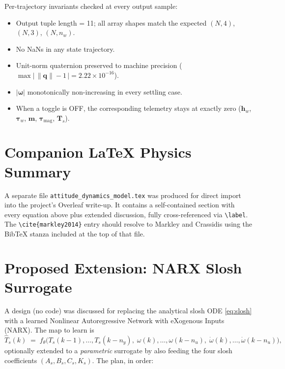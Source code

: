 \noindent Per-trajectory invariants checked at every output sample:
\begin{itemize}\setlength{\itemsep}{1pt}
  \item Output tuple length = 11; all array shapes match the expected
        \((N,4)\), \((N,3)\), \((N,n_w)\).
  \item No NaNs in any state trajectory.
  \item Unit-norm quaternion preserved to machine precision
        (\(\max\bigl|\,\|\bm{q}\|-1\,\bigr| = 2.22\times10^{-16}\)).
  \item \(|\bm{\omega}|\) monotonically non-increasing in every settling case.
  \item When a toggle is OFF, the corresponding telemetry stays at
        exactly zero (\(\bm{h}_w\), \(\bm{\tau}_w\), \(\bm{m}\),
        \(\bm{\tau}_{\text{mag}}\), \(\bm{T}_s\)).
\end{itemize}


\section{Companion LaTeX Physics Summary}

A separate file \texttt{attitude\_dynamics\_model.tex} was produced for
direct import into the project's Overleaf write-up. It contains a
self-contained section with every equation above plus extended
discussion, fully cross-referenced via \texttt{\textbackslash label}.
The \texttt{\textbackslash cite\{markley2014\}} entry should resolve to
Markley and Crassidis using the BibTeX stanza included at the top of that
file.


\section{Proposed Extension: NARX Slosh Surrogate}

A design (no code) was discussed for replacing the analytical slosh ODE
\eqref{eq:slosh} with a learned Nonlinear Autoregressive Network with
eXogenous Inputs (NARX). The map to learn is
\begin{equation}
\hat{T}_s(k) \;=\; f_\theta\bigl(
  T_s(k{-}1),\dots,T_s(k{-}n_y),\;
  \omega(k),\dots,\omega(k{-}n_u),\;
  \dot\omega(k),\dots,\dot\omega(k{-}n_u)
\bigr),
\end{equation}
optionally extended to a \emph{parametric} surrogate by also feeding the
four slosh coefficients \((A_s, B_s, C_s, K_s)\). The plan, in order:


